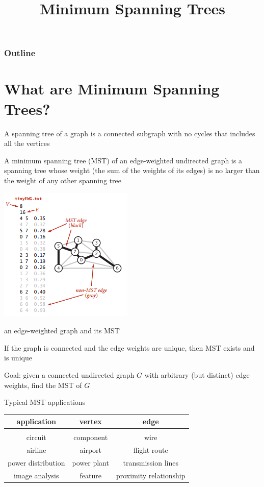 \documentclass[8pt,a4paper,compress]{beamer}
\title{Minimum Spanning Trees}
\date{}
\begin{document}
\begin{frame}
\vfill
\titlepage
\end{frame}

\begin{frame}
\frametitle{Outline}
\tableofcontents
\end{frame}

\section{What are Minimum Spanning Trees?}
\begin{frame}[fragile]
A spanning tree of a graph is a connected subgraph with no cycles that includes all the vertices

\bigskip

A minimum spanning tree (MST) of an edge-weighted undirected graph is a spanning tree whose weight (the sum of the weights of its edges) is no larger than the weight of any other spanning tree

\begin{center}
\includegraphics[scale=0.4]{./figures/mst1.png}

\smallskip

\tiny an edge-weighted graph and its MST
\end{center}

If the graph is connected and the edge weights are unique, then MST exists and is unique

\bigskip

Goal: given a connected undirected graph $G$ with arbitrary (but distinct) edge weights, find the MST of $G$
\end{frame}

\begin{frame}[fragile]
Typical MST applications

\begin{center}
\begin{tabular}{ccc}
application & vertex & edge \\ \hline \\
circuit & component & wire \\
airline & airport & flight route \\
power distribution & power plant & transmission lines \\
image analysis & feature & proximity relationship
\end{tabular}
\end{center}
\end{frame}
\end{document}
